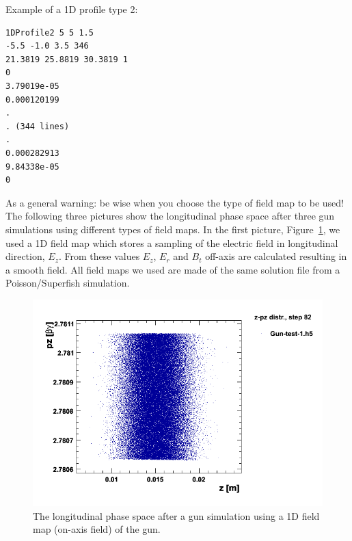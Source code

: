 \noindent Example of a 1D profile type 2:
\begin{verbatim}
1DProfile2 5 5 1.5
-5.5 -1.0 3.5 346
21.3819 25.8819 30.3819 1
0
3.79019e-05
0.000120199
.
. (344 lines)
.
0.000282913
9.84338e-05
0
\end{verbatim}
\leftpointright As a general warning: be wise when you choose the type of field map to be used! The following three pictures show the longitudinal phase space after three gun simulations using different types of field maps. In the first picture, Figure~\ref{figure_1ddynamic_step82}, we used a 1D field map which stores a sampling of the electric field in longitudinal direction, $E_z$. From these values $E_z$, $E_r$ and $B_t$ off-axis are calculated resulting in a smooth field. All field maps we used are made of the same solution file from a Poisson/Superfish simulation.
\begin{figure}
  \begin{center}
  \includegraphics[origin=bl,height=80mm,angle=0]{./figures/Fieldmaps/1DDynamic_step82.png}
  \caption{\label{figure_1ddynamic_step82}
    The longitudinal phase space after a gun simulation using a 1D field map (on-axis field) of the gun.
  }
  \end{center}
%
\end{figure}

